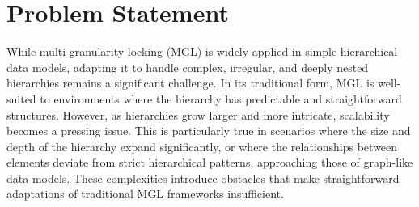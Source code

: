 




\section{Problem Statement}

While multi-granularity locking (MGL) is widely applied in simple hierarchical data models, adapting it to handle complex, irregular, and deeply nested hierarchies remains a significant challenge. In its traditional form, MGL is well-suited to environments where the hierarchy has predictable and straightforward structures. However, as hierarchies grow larger and more intricate, scalability becomes a pressing issue. This is particularly true in scenarios where the size and depth of the hierarchy expand significantly, or where the relationships between elements deviate from strict hierarchical patterns, approaching those of graph-like data models. These complexities introduce obstacles that make straightforward adaptations of traditional MGL frameworks insufficient.

